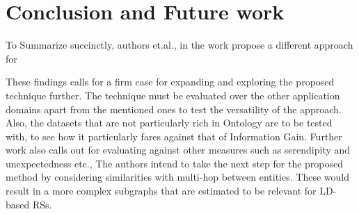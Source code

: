 \chapter{Conclusion and Future work}
\label{ch:conclusion}

To Summarize succinctly, authors  et.al., in the work  propose a different approach for 

These findings calls for a firm case for expanding and exploring the proposed technique further. The technique must be evaluated over the other application domains apart from the mentioned ones to test the versatility of the approach. Also, the datasets that are not particularly rich in Ontology are to be tested with, to see how it particularly fares against that of Information Gain. Further work also calls out for evaluating against other measures such as serendipity and unexpectedness etc., The authors intend to take the next step for the proposed method by considering similarities with multi-hop between entities. These would result in a more complex subgraphs that are estimated to be relevant for LD-based RSs.